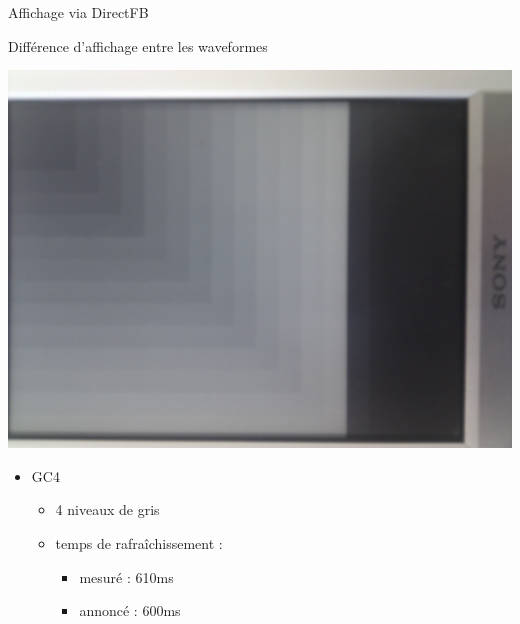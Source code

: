 \begin{frame}{ Affichage via DirectFB }
	\begin{block} { Différence d'affichage entre les waveformes }
		\parbox{0.3\linewidth}{
			\includegraphics[angle=-90,origin=c,scale=0.04]{gc4_8.jpg}
		}
		\parbox{0.6\linewidth}{
			\begin{itemize}
				\item GC4
				\begin{itemize}
					\item 4 niveaux de gris
					\item temps de rafraîchissement : 
					\begin{itemize}
						\item mesuré  : 610ms
						\item annoncé  : 600ms
					\end{itemize}		
				\end{itemize}
			\end{itemize}
		}
	\end{block}
\end{frame}

